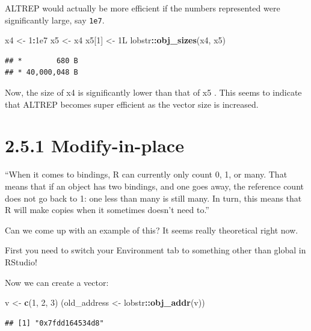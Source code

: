 \documentclass[]{book}
\newenvironment{Shaded}{\begin{snugshade}}{\end{snugshade}}
\newcommand{\DecValTok}[1]{\textcolor[rgb]{0.00,0.00,0.81}{#1}}
\newcommand{\FloatTok}[1]{\textcolor[rgb]{0.00,0.00,0.81}{#1}}
\newcommand{\KeywordTok}[1]{\textcolor[rgb]{0.13,0.29,0.53}{\textbf{#1}}}
\newcommand{\NormalTok}[1]{#1}
\newcommand{\OperatorTok}[1]{\textcolor[rgb]{0.81,0.36,0.00}{\textbf{#1}}}
\newcommand{\StringTok}[1]{\textcolor[rgb]{0.31,0.60,0.02}{#1}}
\begin{document}
ALTREP would actually be more efficient if the numbers represented were significantly large, say \texttt{1e7}.

\begin{Shaded}
\begin{Highlighting}[]
\NormalTok{x4 <-}\StringTok{ }\DecValTok{1}\OperatorTok{:}\FloatTok{1e7}
\NormalTok{x5 <-}\StringTok{ }\NormalTok{x4}
\NormalTok{x5[}\DecValTok{1}\NormalTok{] <-}\StringTok{ }\NormalTok{1L}
\NormalTok{lobstr}\OperatorTok{::}\KeywordTok{obj_sizes}\NormalTok{(x4, x5)}
\end{Highlighting}
\end{Shaded}

\begin{verbatim}
## *        680 B
## * 40,000,048 B
\end{verbatim}

Now, the size of x4 is significantly lower than that of x5 . This seems to indicate that ALTREP becomes super efficient as the vector size is increased.

\hypertarget{modify-in-place}{%
\section*{2.5.1 Modify-in-place}\label{modify-in-place}}

``When it comes to bindings, R can currently only count 0, 1, or many. That means that if an object has two bindings, and one goes away, the reference count does not go back to 1: one less than many is still many. In turn, this means that R will make copies when it sometimes doesn't need to.''

Can we come up with an example of this? It seems really theoretical right now.

First you need to switch your Environment tab to something other than global in RStudio!

Now we can create a vector:

\begin{Shaded}
\begin{Highlighting}[]
\NormalTok{v <-}\StringTok{ }\KeywordTok{c}\NormalTok{(}\DecValTok{1}\NormalTok{, }\DecValTok{2}\NormalTok{, }\DecValTok{3}\NormalTok{)}
\NormalTok{(old_address <-}\StringTok{ }\NormalTok{lobstr}\OperatorTok{::}\KeywordTok{obj_addr}\NormalTok{(v))}
\end{Highlighting}
\end{Shaded}

\begin{verbatim}
## [1] "0x7fdd164534d8"
\end{verbatim}
\end{document}
